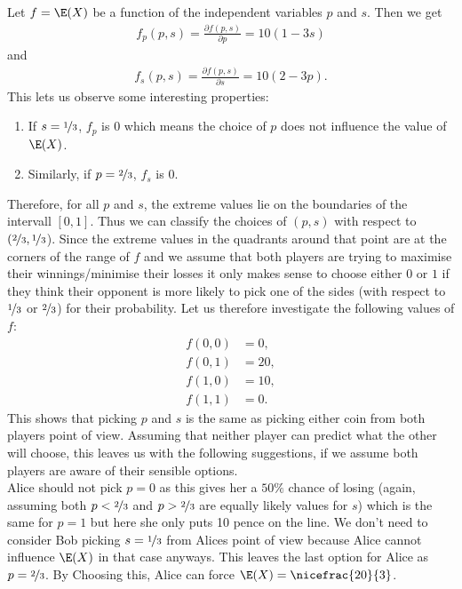 \documentclass{article}
\begin{document}
Let $f=\E(X)$ be a function of the independent variables $p$ and $s$.
Then we get
\begin{align*}
	f_p(p,s)=\frac{\partial f(p,s)}{\partial p} = 10(1-3s)
\end{align*}
and
\begin{align*}
	f_s(p,s)=\frac{\partial f(p,s)}{\partial s} = 10(2-3p).
\end{align*}
This lets us observe some interesting properties:
\begin{enumerate}
	\item If $s=\nicefrac{1}{3}$, $f_p$ is $0$ which means the choice of
	      $p$ does not influence the value of $\E(X)$.
	\item Similarly, if $p=\nicefrac{2}{3}$, $f_s$ is $0$.
\end{enumerate}
Therefore, for all $p$ and $s$, the extreme values lie on the boundaries
of the intervall $[0,1]$. Thus we can classify the choices of $(p,s)$ with
respect to $(\nicefrac{2}{3}, \nicefrac{1}{3}$). Since the extreme values
in the quadrants around that point are at the corners of the range of
$f$ and we assume that both players are trying to maximise their
winnings/minimise their losses it only makes sense to choose either
$0$ or $1$ if they think their opponent is more likely to pick one of the
sides (with respect to $\nicefrac{1}{3}$ or $\nicefrac{2}{3}$) for their
probability. Let us therefore investigate the following values of $f$:
\begin{align*}
	f(0,0) & =0,  \\
	f(0,1) & =20, \\
	f(1,0) & =10, \\
	f(1,1) & =0.
\end{align*}
This shows that picking $p$ and $s$ is the same as picking either
coin from both players point of view. Assuming that neither player
can predict what the other will choose, this leaves us with the following
suggestions, if we assume both players are aware of their sensible options.\\
Alice should not pick $p=0$ as this gives her a $50\%$ chance of losing
(again, assuming both $p<\nicefrac{2}{3}$ and $p>\nicefrac{2}{3}$
are equally likely values for $s$)
which is the same for $p=1$ but here she only puts 10 pence on the line.
We don't need to consider Bob picking $s=\nicefrac{1}{3}$ from Alices
point of view because Alice cannot influence $\E(X)$ in that case anyways.
This leaves the last option for Alice as $p=\nicefrac{2}{3}$.
By Choosing this, Alice can force $\E(X)=\nicefrac{20}{3}$.
\end{document}
